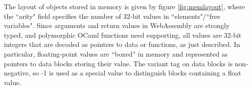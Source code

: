 The layout of objects stored in memory is given by figure \ref{fig:memlayout}, where the ``arity" field specifies the number of 32-bit values in ``elements"/``free variables". Since arguments and return values in WebAssembly are strongly typed, and polymorphic OCaml functions need supporting, all values are 32-bit integers that are decoded as pointers to data or functions, as just described. In particular, floating-point values are ``boxed'' in memory and represented as pointers to data blocks storing their value. The variant tag on data blocks is non-negative, so -1 is used as a special value to distinguish blocks containing a float value.\\


